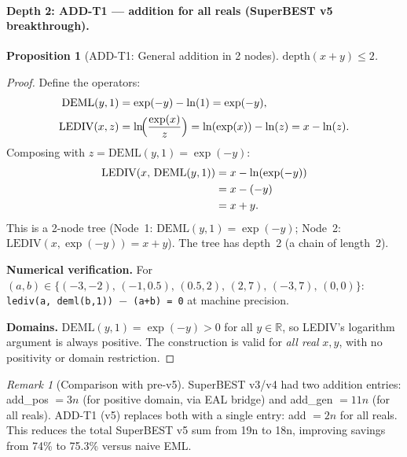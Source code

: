 \documentclass[12pt,a4paper]{article}
\newtheorem{proposition}[theorem]{Proposition}
\theoremstyle{definition}
\theoremstyle{remark}
\newtheorem{remark}[theorem]{Remark}
\begin{document}
\paragraph{Depth 2: ADD-T1 — addition for all reals (SuperBEST v5 breakthrough).}
\label{par:addT1}

\begin{proposition}[ADD-T1: General addition in 2 nodes]\label{prop:addT1}
$\mathrm{depth}(x + y) \leq 2$.
\end{proposition}

\begin{proof}
Define the operators:
\begin{align}
  \mathrm{DEML}(y, 1) &= \exp(-y) - \ln(1) = \exp(-y), \label{eq:deml}\\
  \mathrm{LEDIV}(x, z) &= \ln\!\Bigl(\frac{\exp(x)}{z}\Bigr)
                        = \ln(\exp(x)) - \ln(z)
                        = x - \ln(z). \label{eq:lediv}
\end{align}
Composing with $z = \mathrm{DEML}(y,1) = \exp(-y)$:
\begin{align}
  \mathrm{LEDIV}(x,\, \mathrm{DEML}(y,1))
  &= x - \ln(\exp(-y)) \notag\\
  &= x - (-y) \notag\\
  &= x + y. \label{eq:add2}
\end{align}
This is a 2-node tree (Node~1: $\mathrm{DEML}(y,1) = \exp(-y)$;
Node~2: $\mathrm{LEDIV}(x, \exp(-y)) = x+y$).
The tree has depth~2 (a chain of length~2).

\medskip
\noindent\textbf{Numerical verification.}
For $(a,b) \in \{(-3,-2),\,(-1, 0.5),\,(0.5, 2),\,(2, 7),\,(-3, 7),\,(0,0)\}$:
\texttt{lediv(a, deml(b,1)) $-$ (a+b) = 0} at machine precision.

\noindent\textbf{Domains.}
$\mathrm{DEML}(y,1) = \exp(-y) > 0$ for all $y \in \mathbb{R}$, so LEDIV's logarithm
argument is always positive.  The construction is valid for \emph{all real} $x, y$,
with no positivity or domain restriction.
\end{proof}

\begin{remark}[Comparison with pre-v5]\label{rem:comparison}
SuperBEST v3/v4 had two addition entries:
add\_pos $= 3n$ (for positive domain, via EAL bridge) and add\_gen $= 11n$ (for all reals).
ADD-T1 (v5) replaces both with a single entry: add $= 2n$ for all reals.
This reduces the total SuperBEST v5 sum from 19n to 18n, improving savings from 74\%
to 75.3\% versus naive EML.
\end{remark}
\end{document}
